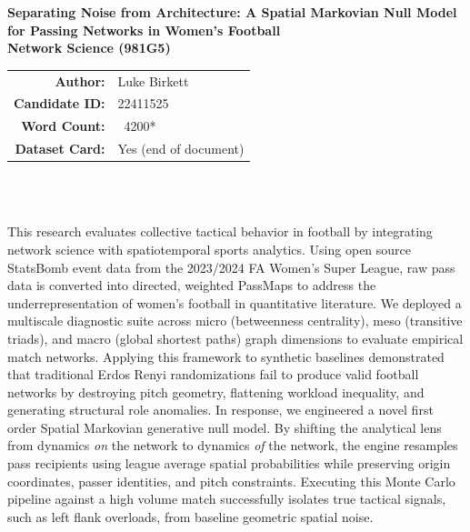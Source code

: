 \documentclass[12pt, a4paper]{article}
\begin{document}
\begin{titlepage}
    \centering
    \vspace*{0.5cm}
    
    {\Large \textbf{Separating Noise from Architecture: A Spatial Markovian Null Model for Passing Networks in Women’s Football}}\\[0.3cm]
    {\large \textbf{Network Science (981G5)}}\\[0.1cm]
    
    \begin{tabular}{r l}
        \textbf{Author:} & Luke Birkett \\
        \textbf{Candidate ID:} & 22411525 \\
        \textbf{Word Count:} & ~4200* \\
        \textbf{Dataset Card:} & Yes (end of document) \\
    \end{tabular}\\[0.5cm]
    
    \begin{minipage}{0.92\textwidth}
        \small
        \textbf{\abstractname}\\[0.3em]
        This research evaluates collective tactical behavior in football by integrating network science with spatiotemporal sports analytics. Using open source StatsBomb event data from the 2023/2024 FA Women's Super League, raw pass data is converted into directed, weighted PassMaps to address the underrepresentation of women's football in quantitative literature. We deployed a multiscale diagnostic suite across micro (betweenness centrality), meso (transitive triads), and macro (global shortest paths) graph dimensions to evaluate empirical match networks. Applying this framework to synthetic baselines demonstrated that traditional Erdos Renyi randomizations fail to produce valid football networks by destroying pitch geometry, flattening workload inequality, and generating structural role anomalies. In response, we engineered a novel first order Spatial Markovian generative null model. By shifting the analytical lens from dynamics \textit{on} the network to dynamics \textit{of} the network, the engine resamples pass recipients using league average spatial probabilities while preserving origin coordinates, passer identities, and pitch constraints. Executing this Monte Carlo pipeline against a high volume match successfully isolates true tactical signals, such as left flank overloads, from baseline geometric spatial noise.
    \end{minipage}\\[1cm]
    

\end{titlepage}
\end{document}
